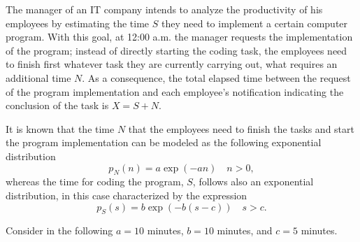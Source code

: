 \else

\question The manager of an IT company intends to analyze the productivity of his employees by estimating the time $S$ they need to implement a certain computer program. With this goal, at 12:00 a.m. the manager requests the implementation of the program; instead of directly starting the coding task, the employees need to finish first whatever task they are currently carrying out, what requires an additional time $N$. As a consequence, the total elapsed time between the request of the program implementation and each employee's notification indicating the conclusion of the task is $X=S+N$.

It is known that the time $N$ that the employees need to finish the tasks and start the program implementation can be modeled as the following exponential distribution
$$p_{N}(n) = a \exp \left(-a n \right)  \quad n>0,$$
whereas the time for coding the program, $S$, follows also an exponential distribution, in this case characterized by the expression
$$p_{S}(s) = b \exp \left(-b  \left(s-c \right)    \right)  \quad s>c.$$

Consider in the following $a=10$ minutes, $b=10$ minutes, and $c=5$ minutes.

